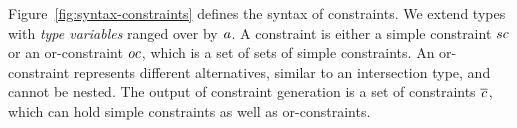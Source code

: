 \documentclass[a4paper,USenglish,cleveref, autoref, thm-restate]{lipics-v2021}
\begin{document}
Figure~\ref{fig:syntax-constraints} defines the syntax of
constraints. We extend types with \emph{type variables} ranged over by
$\mathit{ a }$. A constraint is either a simple constraint $sc$ or
an or-constraint $oc$, which is a set of sets of simple
constraints. An or-constraint represents different alternatives,
similar to an intersection type, and
cannot be nested. The output of constraint generation is a set of
constraints $\overline{\mathit{c}}$, which can hold simple constraints as well as or-constraints.


\end{document}
